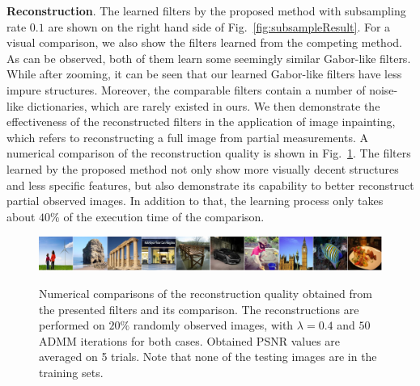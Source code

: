 {\bfseries Reconstruction}. The learned filters by the proposed method with subsampling rate $0.1$ are shown on the right hand side of Fig.~\ref{fig:subsampleResult}. For a visual comparison, we also show the filters learned from the competing method. As can be observed, both of them learn some seemingly similar Gabor-like filters. While after zooming, it can be seen that our learned Gabor-like filters have less impure structures. Moreover, the comparable filters contain a number of noise-like dictionaries, which are rarely existed in ours. We then demonstrate the effectiveness of the reconstructed filters in the application of image inpainting, which refers to reconstructing a full image from partial measurements. A numerical comparison of the reconstruction quality is shown in Fig.~\ref{fig:PSNRrecon}. The filters learned by the proposed method not only show more visually decent structures and less specific features, but also demonstrate its capability to better reconstruct partial observed images. In addition to that, the learning process only takes about $40\%$ of the execution time of the comparison.

\begin{figure}[h]
    \includegraphics[width=1\textwidth]{figure/reconImage.pdf}
    \\
    \caption{Numerical comparisons of the reconstruction quality obtained from the presented filters and its comparison. The reconstructions are performed on $20\%$ randomly observed images, with $\lambda = 0.4$ and $50$ ADMM iterations for both cases. Obtained PSNR values are averaged on 5 trials. Note that none of the testing images are in the training sets.} \label{fig:PSNRrecon}
\end{figure}

